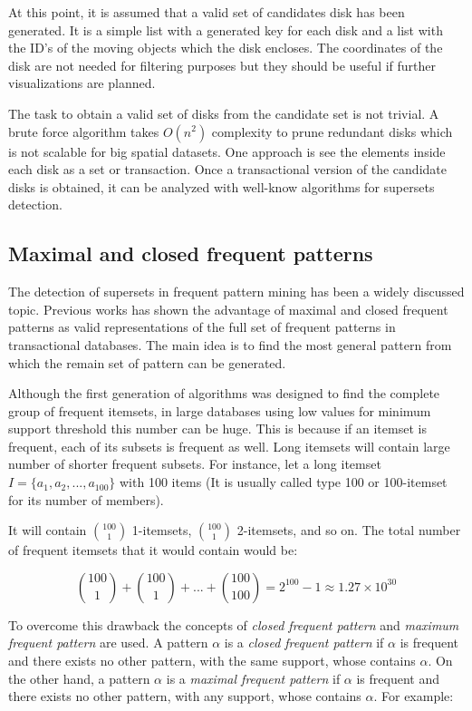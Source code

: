 \documentclass[10pt]{scrartcl}
\begin{document}
At this point, it is assumed that a valid set of candidates disk has been generated.  It is a simple list with a generated key for each disk and a list with the ID's of the moving objects which the disk encloses. The coordinates of the disk are not needed for filtering purposes but they should be useful if further visualizations are planned.

The task to obtain a valid set of disks from the candidate set is not trivial.  A brute force algorithm takes $O(n^2)$ complexity to prune redundant disks which is not scalable for big spatial datasets.  One approach is see the elements inside each disk as a set or transaction.  Once a transactional version of the candidate disks is obtained, it can be analyzed with well-know algorithms for supersets detection.

\subsection*{Maximal and closed frequent patterns}

The detection of supersets in frequent pattern mining has been a widely discussed topic.  Previous works has shown the advantage of maximal and closed frequent patterns as valid representations of the full set of frequent patterns in transactional databases. The main idea is to find the most general pattern from which the remain set of pattern can be generated.

Although the first generation of algorithms was designed to find the complete group of frequent itemsets, in large databases using low values for minimum support threshold this number can be huge. This is because if an itemset is frequent, each of its subsets is frequent as well. Long itemsets will contain large number of shorter frequent subsets. For instance, let a long itemset $I=\{a_1, a_2, ..., a_{100}\}$ with 100 items (It is usually called type 100 or 100-itemset for its number of members). 

It will contain $\binom{100}{1}$ 1-itemsets, $\binom{100}{1}$ 2-itemsets, and so on. The total number of frequent itemsets that it would contain would be:

$$\binom{100}{1} + \binom{100}{1} + ... + \binom{100}{100} = 2^{100} - 1 \approx 1.27 \times 10^{30}$$

To overcome this drawback the concepts of \textit{closed frequent pattern} and \textit{maximum frequent pattern} are used. A pattern $\alpha$ is a \textit{closed frequent pattern} if $\alpha$ is frequent and there exists no other pattern, with the same support, whose contains $\alpha$. On the other hand, a pattern $\alpha$ is a \textit{maximal frequent pattern} if $\alpha$ is frequent and there exists no other pattern, with any support, whose contains $\alpha$. For example:
\end{document}
